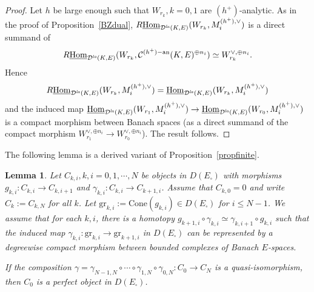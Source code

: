 \documentclass[a4paper,10pt]{amsart}
\theoremstyle{remark}
\theoremstyle{definition}
\theoremstyle{plain}
\newtheorem{lemma}[theorem]{Lemma}
\numberwithin{equation}{section}
\newcommand{\calC}{{\mathcal C}}
\newcommand{\calD}{{\mathcal D}}
\newcommand{\Hom}{{\rm Hom}}
\newcommand{\la}{{\it la}}
\newcommand{\Cone}{\mathrm{Cone}}
\begin{document}
\begin{proof}
	Let $h$ be large enough such that $W_{r_k}, k=0,1$ are $(h^+)$-analytic. As in the proof of Proposition~\ref{BZdual}, $R\underline{\Hom}_{\calD^{\la}(K,E)}(W_{r_k}, M_{i}^{(h^+),\vee})$ is a direct summand of 
	\[R\underline{\Hom}_{\calD^{\la}(K,E)}(W_{r_k}, \calC^{(h^+)-\mathrm{an}}(K,E)^{\oplus n_i})\simeq W_{r_k}^{\vee, \oplus n_i}.\] 
	Hence 
	\[R\underline{\Hom}_{\calD^{\la}(K,E)}(W_{r_k}, M_{i}^{(h^+),\vee})=\underline{\Hom}_{\calD^{\la}(K,E)}(W_{r_k}, M_{i}^{(h^+),\vee})\] 
	and the induced map $\underline{\Hom}_{\calD^{\la}(K,E)}(W_{r_1},M_{i}^{(h^+),\vee})\rightarrow \underline{\Hom}_{\calD^{\la}(K,E)}(W_{r_0},M_{i}^{(h^+),\vee})$ is a compact morphism between Banach spaces (as a direct summand of the compact morphism $W_{r_1}^{\vee,\oplus n_i}\rightarrow W_{r_0}^{\vee,\oplus n_i}$). The result follows.
\end{proof}
The following lemma is a derived variant of Proposition~\ref{propfinite}. 
\begin{lemma}\label{lem:strict-filtered-compact}
Let $C_{k,i},k,i=0,1,\cdots,N$ be objects in $D(E_{\square})$ with morphisms $g_{k,i}:C_{k,i}\rightarrow C_{k,i+1}$ and $\gamma_{k,i}:C_{k,i}\rightarrow C_{k+1,i}$. Assume that $C_{k,0}=0$ and write $C_k:=C_{k,N}$ for all $k$. Let $\mathrm{gr}_{k,i}:=\Cone(g_{k,i})\in D(E_{\square})$ for $i\leq N-1$. We assume that for each $k,i$, there is a homotopy $g_{k+1,i}\circ\gamma_{k,i}
\simeq \gamma_{k,i+1}\circ g_{k,i}$ such that the induced map $\gamma_{k,i}:\mathrm{gr}_{k,i}\rightarrow \mathrm{gr}_{k+1,i}$ in $D(E_{\square})$ can be represented by a degreewise compact morphism between bounded complexes of Banach $E$-spaces.

If the composition $\gamma=\gamma_{N-1,N}\circ\cdots\circ\gamma_{1,N}\circ \gamma_{0,N}: C_{0}\rightarrow C_{N}$ is a quasi-isomorphism, then $C_0$ is a perfect object in $D(E_{\square})$.
\end{lemma}
\end{document}
